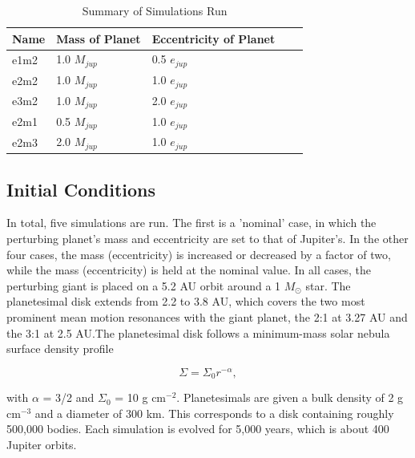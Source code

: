 \documentclass[twocolumn]{aastex63}
\begin{document}
\begin{table}
\begin{center}
\caption{Summary of Simulations Run}
\begin{tabular}{lllll} \hline \hline
Name     & Mass of Planet & Eccentricity of Planet &  &  \\ \hline
e1m2 & 1.0 $M_{jup}$                     & 0.5 $e_{jup}$                            &  &  \\
e2m2      & 1.0 $M_{jup}$                     & 1.0 $e_{jup}$                             &  &  \\
e3m2 & 1.0 $M_{jup}$                     & 2.0 $e_{jup}$                             &  &  \\
e2m1 & 0.5 $M_{jup}$                   & 1.0 $e_{jup}$                             &  &  \\
e2m3 & 2.0 $M_{jup}$                     & 1.0 $e_{jup}$                             &  &  \\ \hline
\end{tabular}
\label{tab:sims}
\end{center}
\end{table}

\subsection{Initial Conditions}\label{sec:ics}

In total, five simulations are run. The first is a 'nominal' case, in which the perturbing planet's mass and eccentricity are set to that of Jupiter's. 
In the other four cases, the mass (eccentricity) is increased or decreased by a factor of two, while the mass (eccentricity) is held at the nominal 
value. In all cases, the perturbing giant is placed on a 5.2 AU orbit around a 1 $M_{\odot}$ star. The planetesimal disk extends from 2.2 to 3.8 
AU, which covers the two most prominent mean motion resonances with the giant planet, the 2:1 at 3.27 AU and the 3:1 at 2.5 AU.The 
planetesimal disk follows a minimum-mass solar nebula surface density profile \citep{1981PThPS..70...35H}

\begin{equation}\label{eq:surf_den}
	\Sigma = \Sigma_{0} r^{-\alpha},
\end{equation}

\noindent with $\alpha$ = 3/2 and $\Sigma_{0}$ = 10 g cm$^{-2}$. Planetesimals are given a bulk density of 2 g cm$^{-3}$ and a diameter of 
300 km. This corresponds to a disk containing roughly 500,000 bodies. Each simulation is evolved for 5,000 years, which is about 400 Jupiter 
orbits.
\end{document}
